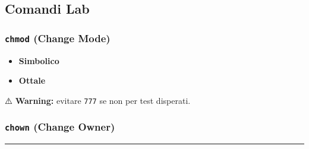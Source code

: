\documentclass[11pt,a4paper]{article}
\providecommand{\tightlist}{%
  \setlength{\itemsep}{0pt}\setlength{\parskip}{0pt}}
\begin{document}
\subsection{Comandi Lab}\label{comandi-lab}

\subsubsection{\texorpdfstring{\texttt{chmod} (Change
Mode)}{chmod (Change Mode)}}\label{chmod-change-mode}

\begin{itemize}
\tightlist
\item
  \textbf{Simbolico}
\end{itemize}

\begin{Shaded}
\begin{Highlighting}[]
\end{Highlighting}
\end{Shaded}

\begin{itemize}
\tightlist
\item
  \textbf{Ottale}
\end{itemize}

\begin{Shaded}
\begin{Highlighting}[]
\end{Highlighting}
\end{Shaded}

⚠️ \textbf{Warning:} evitare \texttt{777} se non per test disperati.

\subsubsection{\texorpdfstring{\texttt{chown} (Change
Owner)}{chown (Change Owner)}}\label{chown-change-owner}

\begin{Shaded}
\begin{Highlighting}[]
\end{Highlighting}
\end{Shaded}

\begin{center}\rule{0.5\linewidth}{0.5pt}\end{center}
\end{document}

